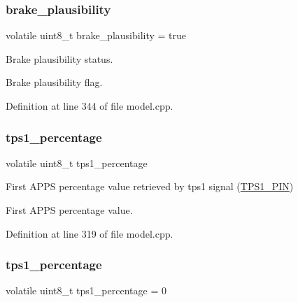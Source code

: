 \subsubsection{\texorpdfstring{brake\+\_\+plausibility}{brake\_plausibility}\hspace{0.1cm}{\footnotesize\ttfamily [2/2]}}
{\footnotesize\ttfamily volatile uint8\+\_\+t brake\+\_\+plausibility = true}



Brake plausibility status. 

Brake plausibility flag. 

Definition at line 344 of file model.\+cpp.

\mbox{\label{group___board__model__group_ga1d42f28ccf027a3243fad064fa47ef81}} 
\subsubsection{\texorpdfstring{tps1\+\_\+percentage}{tps1\_percentage}\hspace{0.1cm}{\footnotesize\ttfamily [1/2]}}
{\footnotesize\ttfamily volatile uint8\+\_\+t tps1\+\_\+percentage}



First A\+P\+PS percentage value retrieved by tps1 signal (\mbox{\hyperlink{group___board__pinout__group_gae9aa914854f611488701c96a330b0bd4}{T\+P\+S1\+\_\+\+P\+IN}}) 

First A\+P\+PS percentage value. 

Definition at line 319 of file model.\+cpp.

\mbox{\label{group___board__model__group_ga1d42f28ccf027a3243fad064fa47ef81}} 
\subsubsection{\texorpdfstring{tps1\+\_\+percentage}{tps1\_percentage}\hspace{0.1cm}{\footnotesize\ttfamily [2/2]}}
{\footnotesize\ttfamily volatile uint8\+\_\+t tps1\+\_\+percentage = 0}



